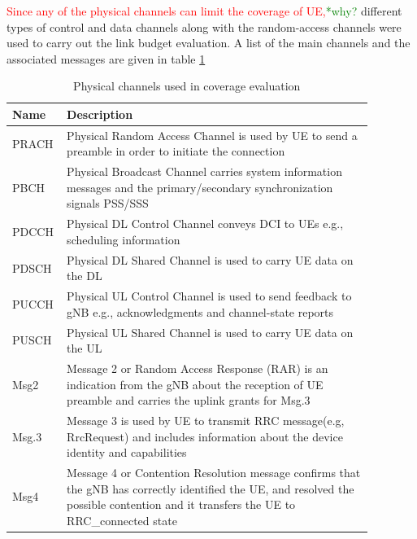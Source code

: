 \documentclass[]{IEEEtran}
\newcommand{\CAREPL}[2]{\textcolor{red}{#1}\textcolor{green}{#2}}
\begin{document}
\CAREPL{Since any of the physical channels can limit the coverage of UE,}{*why?} different types of control and data channels along with the random-access channels were used to carry out the link budget evaluation. A list of the main channels and the associated messages are given in table \ref{table:coverage-evaluation-physical-channels}
\begin{table}
\centering
\caption{Physical channels used in coverage evaluation}
\begin{tabular}{| m{0.08\linewidth}  m{0.8\linewidth}|} 
 \hline
    \textbf{Name}  &  \textbf{Description} \\
\hline
    PRACH & Physical Random Access Channel is used by UE to send a preamble in order to initiate the connection\\
\hline
    PBCH & Physical Broadcast Channel carries system information messages and the primary/secondary synchronization signals PSS/SSS\\
\hline
    PDCCH & Physical DL Control Channel conveys DCI to UEs e.g., scheduling information \\
\hline
    PDSCH &  Physical DL Shared Channel is used to carry UE data on the DL\\
\hline
    PUCCH &  Physical UL Control Channel is used to send feedback to gNB e.g., acknowledgments and channel-state reports\\
\hline
    PUSCH &  Physical UL Shared Channel is used to carry UE data on the UL\\
\hline
    Msg2 &  Message 2 or Random Access Response (RAR) is an indication from the gNB about the reception of UE preamble and carries the uplink grants for Msg.3\\
\hline
    Msg.3 &  Message 3 is used by UE to transmit RRC message(e.g, RrcRequest) and includes information about the device identity and capabilities\\ 
\hline
    Msg4 &  Message 4 or Contention Resolution message confirms that the gNB has correctly identified the UE, and resolved the possible contention and it transfers the UE to RRC\_connected state\\
\hline
\end{tabular}
\label{table:coverage-evaluation-physical-channels}
\end{table}
\end{document}
